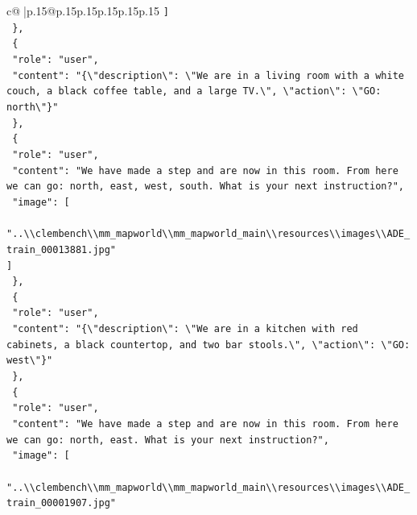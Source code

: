 \documentclass{article}
\begin{document}
{\begin{supertabular}{c@{$\;$}|p{.15\linewidth}@{}p{.15\linewidth}p{.15\linewidth}p{.15\linewidth}p{.15\linewidth}p{.15\linewidth}}
{{{\texttt{    {]}} \\
\texttt{  \},} \\
\texttt{  \{} \\
\texttt{    "role": "user",} \\
\texttt{    "content": "\{\textbackslash{}"description\textbackslash{}": \textbackslash{}"We are in a living room with a white couch, a black coffee table, and a large TV.\textbackslash{}", \textbackslash{}"action\textbackslash{}": \textbackslash{}"GO: north\textbackslash{}"\}"} \\
\texttt{  \},} \\
\texttt{  \{} \\
\texttt{    "role": "user",} \\
\texttt{    "content": "We have made a step and are now in this room. From here we can go: north, east, west, south. What is your next instruction?",} \\
\texttt{    "image": {[}} \\
\texttt{      "..\textbackslash{}\textbackslash{}clembench\textbackslash{}\textbackslash{}mm\_mapworld\textbackslash{}\textbackslash{}mm\_mapworld\_main\textbackslash{}\textbackslash{}resources\textbackslash{}\textbackslash{}images\textbackslash{}\textbackslash{}ADE\_train\_00013881.jpg"} \\
\texttt{    {]}} \\
\texttt{  \},} \\
\texttt{  \{} \\
\texttt{    "role": "user",} \\
\texttt{    "content": "\{\textbackslash{}"description\textbackslash{}": \textbackslash{}"We are in a kitchen with red cabinets, a black countertop, and two bar stools.\textbackslash{}", \textbackslash{}"action\textbackslash{}": \textbackslash{}"GO: west\textbackslash{}"\}"} \\
\texttt{  \},} \\
\texttt{  \{} \\
\texttt{    "role": "user",} \\
\texttt{    "content": "We have made a step and are now in this room. From here we can go: north, east. What is your next instruction?",} \\
\texttt{    "image": {[}} \\
\texttt{      "..\textbackslash{}\textbackslash{}clembench\textbackslash{}\textbackslash{}mm\_mapworld\textbackslash{}\textbackslash{}mm\_mapworld\_main\textbackslash{}\textbackslash{}resources\textbackslash{}\textbackslash{}images\textbackslash{}\textbackslash{}ADE\_train\_00001907.jpg"} \\
}}}
\end{supertabular}}
\end{document}
